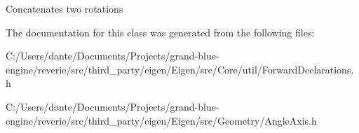 Concatenates two rotations 

The documentation for this class was generated from the following files\+:\begin{DoxyCompactItemize}
\item 
C\+:/\+Users/dante/\+Documents/\+Projects/grand-\/blue-\/engine/reverie/src/third\+\_\+party/eigen/\+Eigen/src/\+Core/util/Forward\+Declarations.\+h\item 
C\+:/\+Users/dante/\+Documents/\+Projects/grand-\/blue-\/engine/reverie/src/third\+\_\+party/eigen/\+Eigen/src/\+Geometry/Angle\+Axis.\+h\end{DoxyCompactItemize}

